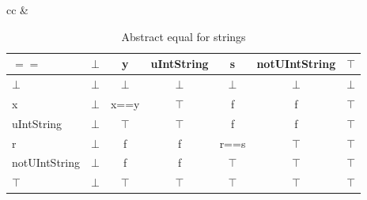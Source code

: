 \begin{table}[htbp]
\begin{tabular}{cc}
 &
\end{tabular}
\caption{Abstract comparison operators for booleans}
\end{table}

\begin{table}[htbp]
\centering
\begin{tabular}{l|cccccc}
$==$          & $\bot$ & y      & uIntString & s      & notUIntString & $\top$ \\\hline
$\bot$        & $\bot$ & $\bot$ & $\bot$     & $\bot$ & $\bot$        & $\bot$ \\
x             & $\bot$ & x==y   & $\top$     & f      & f             & $\top$ \\
uIntString    & $\bot$ & $\top$ & $\top$     & f      & f             & $\top$ \\
r             & $\bot$ & f      & f          & r==s   & $\top$        & $\top$ \\
notUIntString & $\bot$ & f      & f          & $\top$ & $\top$        & $\top$ \\
$\top$        & $\bot$ & $\top$ & $\top$     & $\top$ & $\top$        & $\top$
\end{tabular}
\caption{Abstract equal for strings}
\label{tab:abstract_equal_string}
\end{table}


